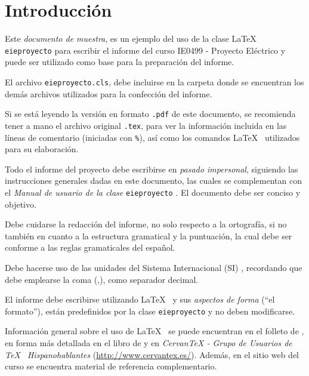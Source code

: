 
\chapter{Introducción}
Este \emph{documento de muestra}, es un ejemplo del uso de la clase \LaTeX~ \texttt{eieproyecto} para escribir el informe del curso IE0499 - Proyecto Eléctrico y puede ser utilizado como base para la preparación del informe.

El archivo \texttt{eieproyecto.cls}, debe incluirse en la carpeta donde se encuentran los demás archivos utilizados para la confección del informe.

Si se está leyendo la versión en formato \texttt{.pdf} de este documento, se recomienda tener a mano el archivo original \texttt{.tex}, para ver la información incluida en las líneas de comentario (iniciadas con \texttt{\%}), así como los comandos \LaTeX~ utilizados para su elaboración.

Todo el informe del proyecto debe escribirse en \emph{pasado impersonal}, siguiendo las instrucciones generales dadas en este documento, las cuales se complementan con el \emph{Manual de usuario de la clase} \texttt{eieproyecto} \citep{vmaeieproyman}.  El documento debe ser conciso y objetivo. 

Debe cuidarse la redacción del informe, no solo respecto a la ortografía, si no también en cuanto a la estructura gramatical y la puntuación, la cual debe ser conforme a las reglas gramaticales del español.

Debe hacerse uso de las unidades del Sistema Internacional (SI) \citep{RTCR443-2010}, recordando que debe emplearse la coma (,), como separador decimal.

El informe debe escribirse utilizando \LaTeX~ y sus \emph{aspectos de forma} (``el formato''), están predefinidos por la clase \texttt{eieproyecto} y no deben modificarse.

Información general sobre el uso de \LaTeX~ se puede encuentran en el folleto de \cite{nsces}, en forma más detallada en el libro de \cite{latexcomp} y en \emph{CervanTeX - Grupo de Usuarios de \TeX~ Hispanohablantes} (\url{http://www.cervantex.es/}).  Además, en el sitio web del curso se encuentra material de referencia complementario.


